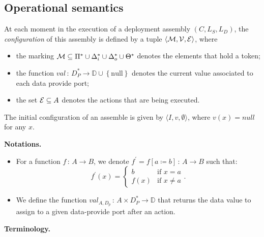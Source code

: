 \subsection{Operational semantics}
\label{subsec:operational_semantics}

At each moment in the execution of a \mad deployment assembly
$(C, L_S, L_D)$, the \emph{configuration} of this assembly is defined by a
tuple $\langle \mathcal{M}, \mathcal{V}, \mathcal{E} \rangle$, where

\begin{itemize}
  \item the marking $\mathcal{M} \subseteq \Pi^{*} \cup
    \Delta_{i}^{*}\cup\Delta_{o}^{*}\cup\Theta^{*}$ denotes the
    elements that hold a token;
  \item the function $val\,:\,D_{P}^{*}\rightarrow \mathbb{D}\cup\left\{ \text{null}\right\}$
    denotes the current value associated to each data provide port;
  \item the set $\mathcal{E} \subseteq A$ denotes the actions that are being executed.
\end{itemize}

The initial configuration of an assemble is given by $\langle I, v,
\emptyset\rangle$, where $v(x) = null$ for any $x$.

\noindent\textbf{Notations.}
\begin{itemize}
  \item For a function $f\,:\,A\rightarrow B$, we denote $f^{\prime}=f\left[a\coloneqq b\right]\,:\,A\rightarrow B$ such that:
    \begin{equation*}
      f^{\prime}\left(x\right)=\begin{cases}
      b & \text{if }x=a\\
      f\left(x\right) & \text{if }x\neq a
      \end{cases}.
    \end{equation*}
  \item We define the function $val_{A,D_p}\,:\,A\times
    D_{P}^*\rightarrow \mathbb{D}$ that returns the data value to assign to a
    given data-provide port after an action.
\end{itemize}

\noindent\textbf{Terminology.}

